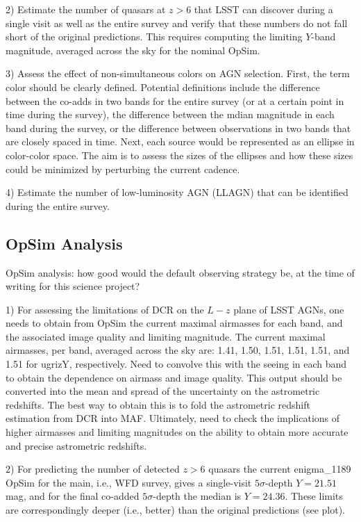 2) Estimate the number of quasars at $z>6$ that LSST can discover
during a single visit as well as the entire survey and verify that
these numbers do not fall short of the original predictions. This
requires computing the limiting $Y$-band magnitude, averaged
across the sky for the nominal OpSim.

3) Assess the effect of non-simultaneous colors on AGN selection.
First, the term color should be clearly defined. Potential definitions
include the difference between the co-adds in two bands for the entire
survey (or at a certain point in time during the survey), the difference
between the mdian magnitude in each band during the survey, or the
difference between observations in two bands that are closely spaced in time.
Next, each source would be represented as an ellipse in color-color space.
The aim is to assess the sizes of the ellipses and how these sizes could be
minimized by perturbing the current cadence.

4) Estimate the number of low-luminosity AGN (LLAGN) that can be
identified during the entire survey.


\subsection{OpSim Analysis}
\label{sec:\secname:analysis}

OpSim analysis: how good would the default observing strategy be, at
the time of writing for this science project?

1) For assessing the limitations of DCR on the $L-z$ plane of LSST AGNs,
one needs to obtain from OpSim the current maximal airmasses for each band,
and the associated image quality and limiting magnitude. The current maximal airmasses,
per band, averaged across the sky are: 1.41, 1.50, 1.51, 1.51, 1.51,
and 1.51 for ugrizY, respectively. Need to convolve this with the
seeing in each band to obtain the dependence on airmass and image
quality. This output should be converted into the mean and spread
of the uncertainty on the astrometric redshifts. The best way
to obtain this is to fold the astrometric redshift estimation from
DCR into MAF. Ultimately, need to check the implications of higher
airmasses and limiting magnitudes on the ability to obtain more accurate
and precise astrometric redshifts.

2) For predicting the number of detected $z>6$ quasars
the current enigma\_1189 OpSim for the main, i.e., WFD survey, gives a single-visit
$5\sigma$-depth
$Y=21.51$ mag, and for the final co-added $5\sigma$-depth the median is $Y=24.36$.
These limits are correspondingly deeper (i.e., better) than the original predictions
(see plot).

